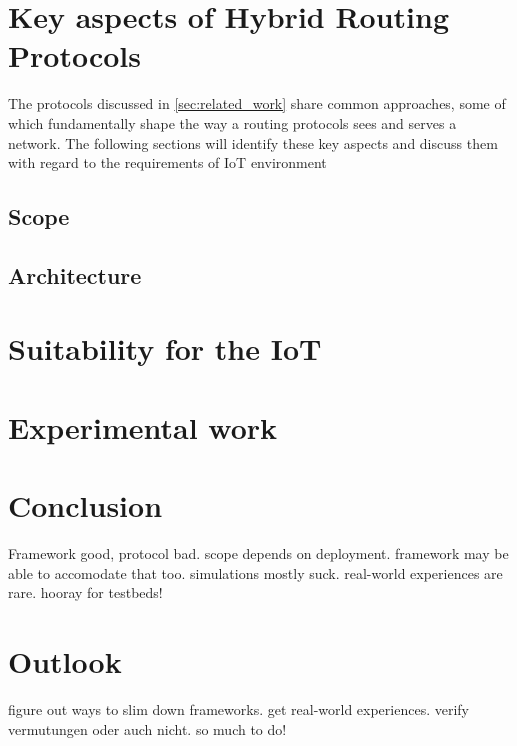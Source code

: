 \documentclass[a4paper,10pt]{scrartcl}
\begin{document}
\section{Key aspects of Hybrid Routing Protocols}
\label{sec:key_aspects}
The protocols discussed in \ref{sec:related_work} share common approaches, some of which fundamentally shape the way a routing protocols sees and serves a network. The following sections will identify these key aspects and discuss them with regard to the requirements of IoT environment


\subsection{Scope}
\label{subsec:scope}

\subsection{Architecture}
\label{subsec:architecture}

\section{Suitability for the IoT}
\label{sec:key_aspects}

\section{Experimental work}
\label{sec:experiments}


\section{Conclusion}
\label{sec:conclusion}
Framework good, protocol bad. scope depends on deployment. framework may be able to accomodate that too. simulations mostly suck. real-world experiences are rare. hooray for testbeds!

\section{Outlook}
\label{sec:outlook}
figure out ways to slim down frameworks.
get real-world experiences. verify vermutungen oder auch nicht. so much to do!

\printglossaries

{\small


}
\end{document}
